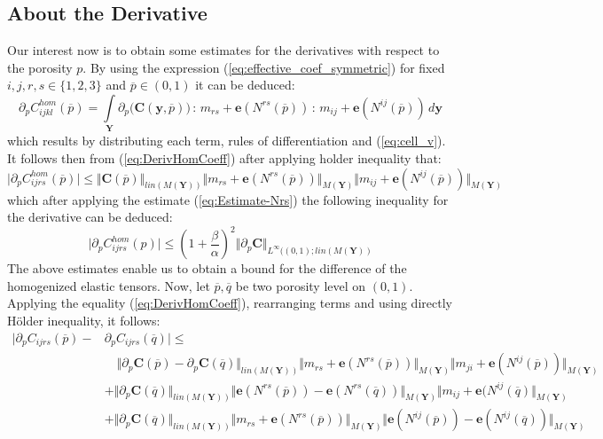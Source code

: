 \subsection{About the Derivative}
Our interest now is to obtain some estimates for the derivatives with respect to the porosity $p$. By using the expression (\ref{eq:effective_coef_symmetric}) for fixed $i,j,r,s \in \{1,2,3\}$ and $\overline{p} \in (0,1)$ it can be deduced:
\begin{equation}
    \label{eq:DerivHomCoeff}
    \partial_{p}  C_{ijkl}^{hom} (\overline{p}) = \int\limits_{\mathbf{Y}} \partial_{p}\big( \mathbf{C}(\mathbf{y},\overline{p}) \big)\, : \,m_{rs}+\mathbf{e}(N^{rs}(\overline{p}))\, :\,m_{ij}+\mathbf{e}(N^{ij}(\overline{p})) \, d\mathbf{y} 
\end{equation}
which results by distributing each term, rules of differentiation and (\ref{eq:cell_v}).
It follows then from (\ref{eq:DerivHomCoeff}) after applying holder inequality that:
\begin{equation*}
    \vert \partial_p C^{hom}_{ijrs}(\overline{p}) \vert \leq \Vert \mathbf{C}(\overline{p}) \Vert_{lin(M(\mathbf{Y}))} \Vert m_{rs} + \mathbf{e}(N^{rs}(\overline{p})) \Vert_{M(\mathbf{Y})} \Vert m_{ij} + \mathbf{e}(N^{ij}(\overline{p})) \Vert_{M(\mathbf{Y})}
\end{equation*}
which after applying the estimate (\ref{eq:Estimate-Nrs}) the following inequality for the derivative can be deduced:
\begin{equation}
    \label{EstimateDerivHomCoeff}
    \vert \partial_p C^{hom}_{ijrs}(p) \vert \leq (1+\frac{\beta}{\alpha})^2 \Vert \partial_p \mathbf{C}\Vert_{L^{\infty}((0,1); lin(M(\mathbf{Y}))}
\end{equation}
The above estimates enable us to obtain a bound for the difference of the homogenized elastic tensors. Now, let $\overline{p}, \overline{q}$ be two porosity level on $(0,1)$.
Applying the equality (\ref{eq:DerivHomCoeff}), rearranging terms and using directly H\"{o}lder inequality, it follows:
\begin{align*}
    \vert \partial_p C_{ijrs}(\overline{p}) - & \partial_p C_{ijrs}(\overline{q}) \vert \leq  \quad \\
    &\quad \Vert \partial_p \mathbf{C}(\overline{p}) - \partial_p \mathbf{C}(\overline{q}) \Vert_{lin(M(\mathbf{Y}))} \Vert m_{rs} + \mathbf{e}(N^{rs}(\overline{p})) \Vert_{M(\mathbf{Y})} \Vert m_{ji} + \mathbf{e}(N^{ij}(\overline{p}))\Vert_{M(\mathbf{Y})} \\
    & + \Vert \partial_p \mathbf{C}(\overline{q}) \Vert_{lin(M(\mathbf{Y}))} \Vert \mathbf{e}(N^{rs}(\overline{p})) -\mathbf{e}(N^{rs}(\overline{q})) \Vert_{M(\mathbf{Y})} \Vert m_{ij} + \mathbf{e}(N^{ij}(\overline{q}) \Vert_{M(\mathbf{Y})}  \\
    & + \Vert \partial_p \mathbf{C}(\overline{q}) \Vert_{lin(M(\mathbf{Y}))} \Vert m_{rs} + \mathbf{e}(N^{rs}(\overline{p})) \Vert_{M(\mathbf{Y})} \Vert \mathbf{e}(N^{ij}(\overline{p})) - \mathbf{e}(N^{ij}(\overline{q})) \Vert_{M(\mathbf{Y})}
\end{align*}
